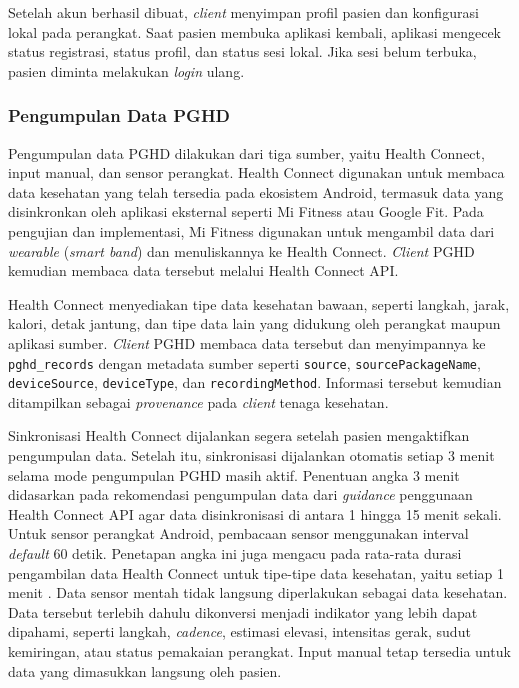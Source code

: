 Setelah akun berhasil dibuat, \textit{client} menyimpan profil pasien dan konfigurasi lokal pada perangkat. 
Saat pasien membuka aplikasi kembali, aplikasi mengecek status registrasi, status profil, dan status sesi lokal. 
Jika sesi belum terbuka, pasien diminta melakukan \textit{login} ulang.

\subsubsection{Pengumpulan Data PGHD}

Pengumpulan data PGHD dilakukan dari tiga sumber, yaitu Health Connect, input manual, dan sensor perangkat. 
Health Connect digunakan untuk membaca data kesehatan yang telah tersedia pada ekosistem Android, termasuk data yang disinkronkan oleh aplikasi eksternal seperti Mi Fitness atau Google Fit. 
Pada pengujian dan implementasi, Mi Fitness digunakan untuk mengambil data dari \textit{wearable} (\textit{smart band}) dan menuliskannya ke Health Connect. 
\textit{Client} PGHD kemudian membaca data tersebut melalui Health Connect API\@.

Health Connect menyediakan tipe data kesehatan bawaan, seperti langkah, jarak, kalori, detak jantung, dan tipe data lain yang didukung oleh perangkat maupun aplikasi sumber. 
\textit{Client} PGHD membaca data tersebut dan menyimpannya ke \texttt{pghd\_records} dengan metadata sumber seperti \texttt{source}, \texttt{sourcePackageName}, \texttt{deviceSource}, \texttt{deviceType}, dan \texttt{recordingMethod}. 
Informasi tersebut kemudian ditampilkan sebagai \textit{provenance} pada \textit{client} tenaga kesehatan.

Sinkronisasi Health Connect dijalankan segera setelah pasien mengaktifkan pengumpulan data. 
Setelah itu, sinkronisasi dijalankan otomatis setiap 3 menit selama mode pengumpulan PGHD masih aktif. 
Penentuan angka 3 menit didasarkan pada rekomendasi pengumpulan data dari \textit{guidance} penggunaan Health Connect API agar data disinkronisasi di antara 1 hingga 15 menit sekali.
Untuk sensor perangkat Android, pembacaan sensor menggunakan interval \textit{default} 60 detik.
Penetapan angka ini juga mengacu pada rata-rata durasi pengambilan data Health Connect untuk tipe-tipe data kesehatan, yaitu setiap 1 menit \parencite{android_hc_write}.
Data sensor mentah tidak langsung diperlakukan sebagai data kesehatan. 
Data tersebut terlebih dahulu dikonversi menjadi indikator yang lebih dapat dipahami, seperti langkah, \textit{cadence}, estimasi elevasi, intensitas gerak, sudut kemiringan, atau status pemakaian perangkat. 
Input manual tetap tersedia untuk data yang dimasukkan langsung oleh pasien.

